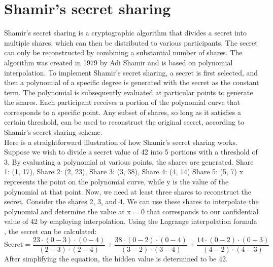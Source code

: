 \documentclass[../Main.tex]{subfiles}
\begin{document}


\section{Shamir's secret sharing}
Shamir's secret sharing is a cryptographic algorithm that divides a secret into multiple shares, which can then be distributed to various participants. The secret can only be reconstructed by combining a substantial number of shares. The algorithm was created in 1979 by Adi Shamir and is based on polynomial interpolation. To implement Shamir's secret sharing, a secret is first selected, and then a polynomial of a specific degree is generated with the secret as the constant term. The polynomial is subsequently evaluated at particular points to generate the shares. Each participant receives a portion of the polynomial curve that corresponds to a specific point. Any subset of shares, so long as it satisfies a certain threshold, can be used to reconstruct the original secret, according to Shamir's secret sharing scheme.\\
Here is a straightforward illustration of how Shamir's secret sharing works.
Suppose we wish to divide a secret value of 42 into 5 portions with a threshold of 3. By evaluating a polynomial at various points, the shares are generated.
Share 1: (1, 17), Share 2: (2, 23), Share 3: (3, 38), Share 4: (4, 14)
Share 5: (5, 7)
x represents the point on the polynomial curve, while y is the value of the polynomial at that point.
Now, we need at least three shares to reconstruct the secret. Consider the shares 2, 3, and 4. We can use these shares to interpolate the polynomial and determine the value at x = 0 that corresponds to our confidential value of 42 by employing interpolation.
Using the Lagrange interpolation formula \cite{larrange-interpolation}, the secret can be calculated:
\[
\text{Secret} = \frac{{23 \cdot (0 - 3) \cdot (0 - 4)}}{{(2 - 3) \cdot (2 - 4)}} +
\frac{{38 \cdot (0 - 2) \cdot (0 - 4)}}{{(3 - 2) \cdot (3 - 4)}} +
\frac{{14 \cdot (0 - 2) \cdot (0 - 3)}}{{(4 - 2) \cdot (4 - 3)}}
\]
After simplifying the equation, the hidden value is determined to be 42.
\end{document}
